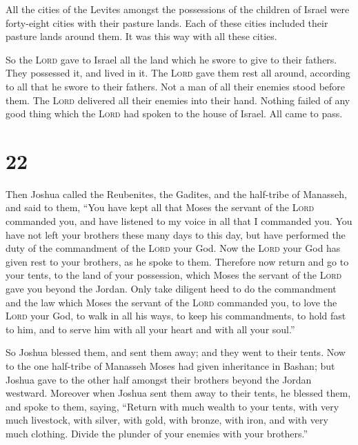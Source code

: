  All the cities of the Levites amongst the possessions of
the children of Israel were forty-eight cities with their pasture lands.
 Each of these cities included their pasture lands around
them. It was this way with all these cities.

 So the \textsc{Lord} gave to Israel all the land which
he swore to give to their fathers. They possessed it, and lived in it.
 The \textsc{Lord} gave them rest all around, according
to all that he swore to their fathers. Not a man of all their enemies
stood before them. The \textsc{Lord} delivered all their enemies into
their hand.  Nothing failed of any good thing which the
\textsc{Lord} had spoken to the house of Israel. All came to pass.

\hypertarget{section-21}{%
\section{22}\label{section-21}}

 Then Joshua called the Reubenites, the Gadites, and the
half-tribe of Manasseh,  and said to them, ``You have kept
all that Moses the servant of the \textsc{Lord} commanded you, and have
listened to my voice in all that I commanded you.  You
have not left your brothers these many days to this day, but have
performed the duty of the commandment of the \textsc{Lord} your God.
 Now the \textsc{Lord} your God has given rest to your
brothers, as he spoke to them. Therefore now return and go to your
tents, to the land of your possession, which Moses the servant of the
\textsc{Lord} gave you beyond the Jordan.  Only take
diligent heed to do the commandment and the law which Moses the servant
of the \textsc{Lord} commanded you, to love the \textsc{Lord} your God,
to walk in all his ways, to keep his commandments, to hold fast to him,
and to serve him with all your heart and with all your soul.''

 So Joshua blessed them, and sent them away; and they went
to their tents.  Now to the one half-tribe of Manasseh
Moses had given inheritance in Bashan; but Joshua gave to the other half
amongst their brothers beyond the Jordan westward. Moreover when Joshua
sent them away to their tents, he blessed them,  and spoke
to them, saying, ``Return with much wealth to your tents, with very much
livestock, with silver, with gold, with bronze, with iron, and with very
much clothing. Divide the plunder of your enemies with your brothers.''

